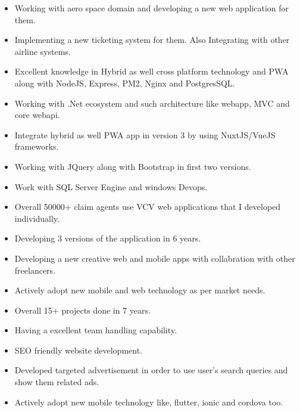 \documentclass[10pt,a4paper]{altacv}
\begin{document}
\begin{itemize}
\item Working with aero space domain and developing a new web application for them.
\item Implementing a new ticketing system for them. Also Integrating with other airline systems.
\item Excellent knowledge in Hybrid as well cross platform technology and PWA along with NodeJS, Express, PM2, Nginx and PostgresSQL.
\end{itemize}
\begin{itemize}
\item Working with .Net ecosystem and such architecture like webapp, MVC and core webapi.
\item Integrate hybrid as well PWA app in version 3 by using NuxtJS/VueJS frameworks.
\item Working with JQuery along with Bootstrap in first two versions.
\item Work with SQL Server Engine and windows Devops.
\item Overall 50000+ claim agents use VCV web applications that I developed individually.
\item Developing 3 versions of the application in 6 years.
\end{itemize}
\begin{itemize}
\item Developing a new creative web and mobile apps with collabration with other freelancers.
\item Actively adopt new mobile and web technology as per market needs.
\item Overall 15+ projects done in 7 years.
\item Having a excellent team handling capability.
\item SEO friendly website development. 
\item Developed targeted advertisement in order to use user's search queries and show them related ads.
\item Actively adopt new mobile technology like, flutter, ionic and cordova too.

\end{itemize}
\end{document}
